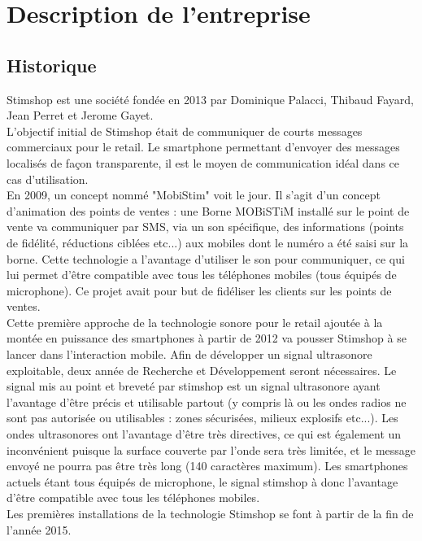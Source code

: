 \documentclass[12pt]{report}
\begin{document}
\chapter{Description de l'entreprise}
	\section{Historique}
Stimshop est une société fondée en 2013 par Dominique Palacci, Thibaud Fayard, Jean Perret et Jerome Gayet.\\

L'objectif initial de Stimshop était de communiquer de courts messages commerciaux pour le retail. Le smartphone permettant d'envoyer des messages localisés de façon transparente, il est le moyen de communication idéal dans ce cas d'utilisation. \\

En 2009, un concept nommé "MobiStim" voit le jour. Il s'agit d'un concept d'animation des points de ventes : une Borne MOBiSTiM installé sur le point de vente va communiquer par SMS, via un son spécifique, des informations (points de fidélité, réductions ciblées etc...) aux mobiles dont le numéro a été saisi sur la borne. Cette technologie a l'avantage d'utiliser le son pour communiquer, ce qui lui permet d'être compatible avec tous les téléphones mobiles (tous équipés de microphone). Ce projet avait pour but de fidéliser les clients sur les points de ventes. \\
 
Cette première approche de la technologie sonore pour le retail ajoutée à la montée en puissance des smartphones à partir de 2012 va pousser Stimshop à se lancer dans l'interaction mobile. Afin de développer un signal ultrasonore exploitable, deux année de Recherche et Développement seront nécessaires. Le signal mis au point et breveté par stimshop est un signal ultrasonore ayant l'avantage d'être précis et utilisable partout (y compris là ou les ondes radios ne sont pas autorisée ou utilisables : zones sécurisées, milieux explosifs etc...). Les ondes ultrasonores ont l'avantage d'être très directives, ce qui est également un inconvénient puisque la surface couverte par l'onde sera très limitée, et le message envoyé ne pourra pas être très long (140 caractères maximum). Les smartphones actuels étant tous équipés de microphone, le signal stimshop à donc l'avantage d'être compatible avec tous les téléphones mobiles. \\

Les premières installations de la technologie Stimshop se font à partir de la fin de l'année 2015. \\
\end{document}
